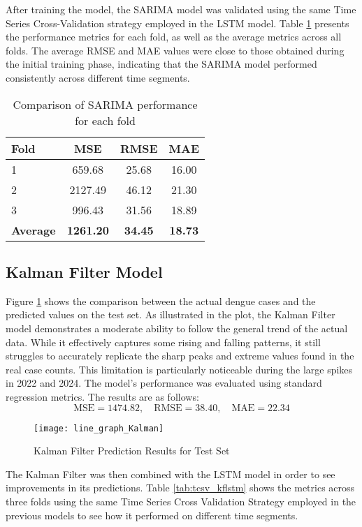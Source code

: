 After training the model, the SARIMA model was validated using the same Time Series Cross-Validation strategy employed in the LSTM model. Table \ref{tab:tcsv_sarima} presents the performance metrics for each fold, as well as the average metrics across all folds. The average RMSE and MAE values were close to those obtained during the initial training phase, indicating that the SARIMA model performed consistently across different time segments.

\begin{table}[h!]
	\centering
	\begin{tabular}{|l|c|c|c|}
		\hline
		\textbf{Fold} & \textbf{MSE} & \textbf{RMSE} & \textbf{MAE} \\
		\hline
		1 & 659.68  & 25.68 & 16.00 \\
		2 & 2127.49 & 46.12 & 21.30 \\
		3 & 996.43  & 31.56 & 18.89 \\
		\hline
		\textbf{Average} & \textbf{1261.20} & \textbf{34.45} & \textbf{18.73} \\
		\hline
	\end{tabular}
	\caption{Comparison of SARIMA performance for each fold}
	\label{tab:tcsv_sarima}
\end{table}


\subsection{Kalman Filter Model}

Figure \ref{fig:Kalman_result} shows the comparison between the actual dengue cases and the predicted values on the test set. As illustrated in the plot, the Kalman Filter model demonstrates a moderate ability to follow the general trend of the actual data. While it effectively captures some rising and falling patterns, it still struggles to accurately replicate the sharp peaks and extreme values found in the real case counts. This limitation is particularly noticeable during the large spikes in 2022 and 2024. The model’s performance was evaluated using standard regression metrics. The results are as follows:
\[
\text{MSE} = 1474.82, \quad
\text{RMSE} = 38.40, \quad
\text{MAE} = 22.34
\]
\begin{figure}[H]
	\centering
	\texttt{[image: line\_graph\_Kalman]}
	\caption{Kalman Filter Prediction Results for Test Set}
	\label{fig:Kalman_result}
\end{figure}

The Kalman Filter was then combined with the LSTM model in order to see improvements in its predictions. Table \ref{tab:tcsv_kflstm} shows the metrics across three folds using the same Time Series Cross Validation Strategy employed in the previous models to see how it performed on different time segments.

